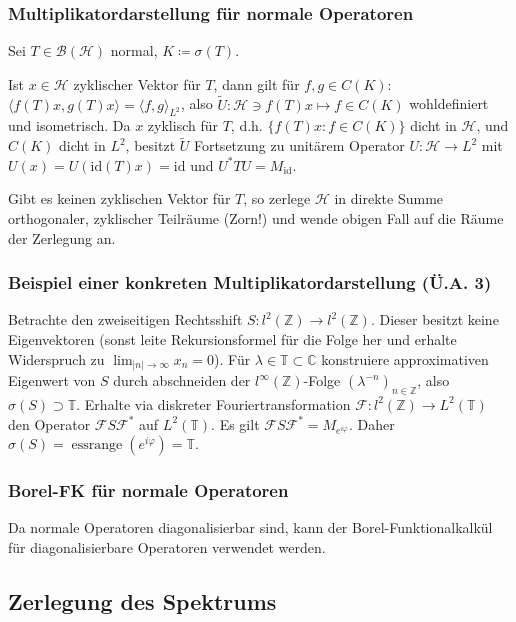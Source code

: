 \documentclass[11pt,a4paper]{scrartcl}
\newcommand{\Z}{\mathbb{Z}} %
\newcommand{\C}{\mathbb{C}} %
\newcommand{\Hc}{\mathcal{H}}
\newcommand{\B}{\mathcal{B}}
\newcommand{\F}{\mathcal{F}}
\theoremstyle{plain}
\theoremstyle{definition}
\theoremstyle{remark}
\DeclareMathOperator{\essrange}{ess range}
\begin{document}
\subsubsection{Multiplikatordarstellung für normale Operatoren}

Sei $T\in \B(\Hc)$ normal, $K\coloneqq \sigma(T)$. 

Ist $x\in \Hc$ zyklischer Vektor für $T$, dann gilt für $f,g\in C(K)$: $\langle f(T)x, g(T)x \rangle = \langle f,g\rangle_{L^2}$, also $\tilde U: \Hc\ni f(T)x \mapsto f \in C(K)$ wohldefiniert und isometrisch. Da $x$ zyklisch für $T$, d.h. $\{ f(T)x: f\in C(K) \}$ dicht in $\Hc$, und $C(K)$ dicht in $L^2$, besitzt $\tilde U$ Fortsetzung zu unitärem Operator $U: \Hc \to L^2$ mit $U(x)=U(\mathrm{id}(T)x)=\mathrm{id}$ und $U^*TU=M_\mathrm{id}$.

Gibt es keinen zyklischen Vektor für $T$, so zerlege $\Hc$ in direkte Summe orthogonaler, zyklischer Teilräume (Zorn!) und wende obigen Fall auf die Räume der Zerlegung an.

\subsubsection{Beispiel einer konkreten Multiplikatordarstellung (Ü.A. 3)}

Betrachte den zweiseitigen Rechtsshift $S: l^2(\Z) \to l^2(\Z)$. Dieser besitzt keine Eigenvektoren (sonst leite Rekursionsformel für die Folge her und erhalte Widerspruch zu $\lim_{|n|\to \infty} x_n = 0$). Für $\lambda \in \mathbb{T} \subset \C$ konstruiere approximativen Eigenwert von $S$ durch abschneiden der $l^\infty(\Z)$-Folge $(\lambda^{-n})_{n\in \Z}$, also $\sigma(S) \supset \mathbb{T}$. Erhalte via diskreter Fouriertransformation $\F: l^2(\Z) \to L^2(\mathbb T)$ den Operator $\F S\F^*$ auf $L^2(\mathbb T)$. Es gilt $\F S\F^*=M_{e^{i\varphi}}$. Daher $\sigma(S)=\essrange(e^{i\varphi})=\mathbb{T}$.

\subsubsection{Borel-FK für normale Operatoren}

Da normale Operatoren diagonalisierbar sind, kann der Borel-Funktionalkalkül für diagonalisierbare Operatoren verwendet werden.

\subsection{Zerlegung des Spektrums}
\end{document}
